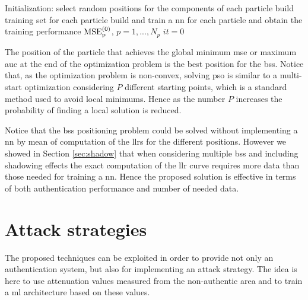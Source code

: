 \documentclass[draftcls,onecolumn,12pt]{IEEEtran}
\begin{document}
\begin{algorithm}[t]
  \scriptsize

 Initialization: select random positions for the components of each particle\;
                 build training set for each particle\;
                 build and train a \ac{nn} for each particle and obtain the training performance $\rm{MSE}_p^{(0)}$, $p=1,...,N_p$\;
                 $it = 0$\;

    
 \caption{BSs positioning algorithm}
\end{algorithm}

The position of the particle that achieves the global minimum \ac{mse} or maximum \ac{auc} at the end of the optimization problem is the best position for the \acp{bs}. Notice that, as the optimization problem is non-convex, solving \ac{pso} is similar to a multi-start  optimization considering $P$ different starting points, which is a standard method used to avoid local minimums. Hence as the number $P$ increases the probability of finding a local solution is reduced.

Notice that the \acp{bs} positioning problem could be solved without implementing a \ac{nn} by mean of computation of the \acp{llr} for the different positions. However we showed in Section \ref{sec:shadow} that when considering multiple \acp{bs} and including shadowing effects the exact computation of the \ac{llr} curve requires more data than those needed for training a \ac{nn}. Hence the proposed solution is effective in terms of both authentication performance and number of needed data.

\section{Attack strategies}
The proposed techniques can be exploited in order to provide not only an authentication system, but also for implementing an attack strategy. The idea is here to use attenuation values measured from the non-authentic area and to train a \ac{ml} architecture based on these values.
\end{document}
